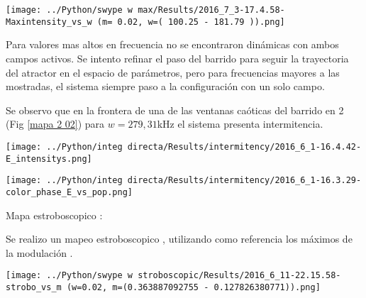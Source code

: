 		\begin{center}
			\texttt{[image: ../Python/swype w max/Results/2016\_7\_3-17.4.58-Maxintensity\_vs\_w (m= 0.02, w=( 100.25 - 181.79 )).png]}
			\label{mapa w 02 ambos campos}
		\end{center}
		
		Para valores mas altos en frecuencia no se encontraron dinámicas con ambos campos activos. Se intento refinar el paso del barrido para seguir la trayectoria del atractor en el espacio de parámetros, pero para frecuencias mayores a las mostradas, el sistema siempre paso a la configuración con un solo campo.
		
		
		Se observo que en la frontera de una de las ventanas caóticas del barrido en 2 (Fig \ref{mapa 2 02}) para $w=279,31$kHz el sistema presenta intermitencia.
		
		\begin{minipage}{0.5\textwidth}
			
			\centering
			\texttt{[image: ../Python/integ directa/Results/intermitency/2016\_6\_1-16.4.42-E\_intensitys.png]}
			
		\end{minipage}
		\begin{minipage}{0.5\textwidth}
			
			\centering
			\texttt{[image: ../Python/integ directa/Results/intermitency/2016\_6\_1-16.3.29-color\_phase\_E\_vs\_pop.png]}
			
		\end{minipage}
		
		
		
		
		Mapa estroboscopico :
		
		Se realizo un mapeo estroboscopico , utilizando como referencia los máximos de la modulación .
				
		\begin{center}
			\texttt{[image: ../Python/swype w stroboscopic/Results/2016\_6\_11-22.15.58-strobo\_vs\_m (w=0.02, m=(0.363887092755 - 0.127826380771)).png]}
		\end{center}
	
